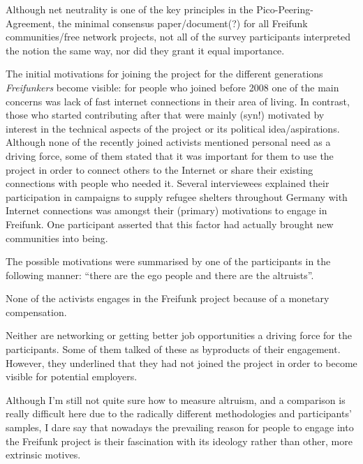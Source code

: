 Although net neutrality is one of the key principles in the Pico-Peering-Agreement, the minimal consensus paper/document(?) for all Freifunk communities/free network projects, not all of the survey participants interpreted the notion the same way, nor did they grant it equal importance.

The initial motivations for joining the project for the different generations \textit{Freifunkers} become visible:
for people who joined before 2008 one of the main concerns was lack of fast internet connections in their area of living.
In contrast, those who started contributing after that were mainly (syn!) motivated by interest in the technical aspects of the project or its political idea/aspirations.
Although none of the recently joined activists mentioned personal need as a driving force,
some of them stated that it was important for them to use the project in order to connect others to the Internet or share their existing connections with people who needed it.
Several interviewees explained their participation in campaigns to supply refugee shelters throughout Germany with Internet connections was amongst their (primary) motivations to engage in Freifunk.
One participant asserted that this factor had actually brought new communities into being.


The possible motivations were summarised by one of the participants in the following manner: ``there are the ego people and there are the altruists''.

None of the activists engages in the Freifunk project because of a monetary compensation.

Neither are networking or getting better job opportunities a driving force for the participants.
Some of them talked of these as byproducts of their engagement.
However, they underlined that they had not joined the project in order to become visible for potential employers.



Although I'm still not quite sure how to measure altruism, and a comparison is really difficult here due to the radically different methodologies and participants' samples, I dare say that nowadays the prevailing reason for people to engage into the Freifunk project is their fascination with its ideology rather than other, more extrinsic motives.



